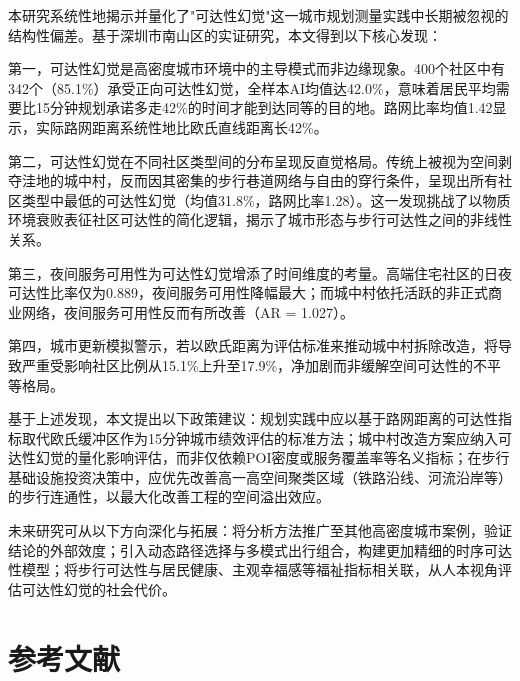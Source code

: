 \documentclass[10pt,conference]{IEEEtran}
\begin{document}
本研究系统性地揭示并量化了"可达性幻觉"这一城市规划测量实践中长期被忽视的结构性偏差。基于深圳市南山区的实证研究，本文得到以下核心发现：

第一，可达性幻觉是高密度城市环境中的主导模式而非边缘现象。400个社区中有342个（85.1\%）承受正向可达性幻觉，全样本AI均值达42.0\%，意味着居民平均需要比15分钟规划承诺多走42\%的时间才能到达同等的目的地。路网比率均值1.42显示，实际路网距离系统性地比欧氏直线距离长42\%。

第二，可达性幻觉在不同社区类型间的分布呈现反直觉格局。传统上被视为空间剥夺洼地的城中村，反而因其密集的步行巷道网络与自由的穿行条件，呈现出所有社区类型中最低的可达性幻觉（均值31.8\%，路网比率1.28）。这一发现挑战了以物质环境衰败表征社区可达性的简化逻辑，揭示了城市形态与步行可达性之间的非线性关系。

第三，夜间服务可用性为可达性幻觉增添了时间维度的考量。高端住宅社区的日夜可达性比率仅为0.889，夜间服务可用性降幅最大；而城中村依托活跃的非正式商业网络，夜间服务可用性反而有所改善（AR = 1.027）。

第四，城市更新模拟警示，若以欧氏距离为评估标准来推动城中村拆除改造，将导致严重受影响社区比例从15.1\%上升至17.9\%，净加剧而非缓解空间可达性的不平等格局。

基于上述发现，本文提出以下政策建议：规划实践中应以基于路网距离的可达性指标取代欧氏缓冲区作为15分钟城市绩效评估的标准方法；城中村改造方案应纳入可达性幻觉的量化影响评估，而非仅依赖POI密度或服务覆盖率等名义指标；在步行基础设施投资决策中，应优先改善高一高空间聚类区域（铁路沿线、河流沿岸等）的步行连通性，以最大化改善工程的空间溢出效应。

未来研究可从以下方向深化与拓展：将分析方法推广至其他高密度城市案例，验证结论的外部效度；引入动态路径选择与多模式出行组合，构建更加精细的时序可达性模型；将步行可达性与居民健康、主观幸福感等福祉指标相关联，从人本视角评估可达性幻觉的社会代价。

\section*{参考文献}
\label{sec:references}




\appendices
\end{document}
